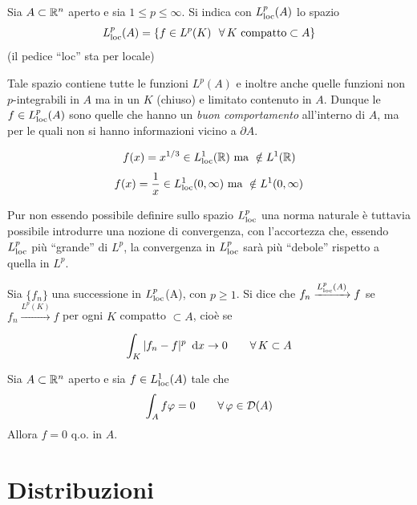 \begin{defn}
Sia $A\subset\mathbb{R}^n$ aperto e sia $1\leq p\leq\infty$. Si indica con $L^{p}_{\operatorname{loc}}(A)$ lo spazio
\begin{equation*}
L^{p}_{\loc}(A)=\left\{f\in L^p(K)\ \ \forall K\text{ compatto}\subset A\right\}
\end{equation*}
(il pedice ``loc'' sta per locale)
\end{defn}
Tale spazio contiene tutte le funzioni $L^p(A)$ e inoltre anche quelle funzioni non $p$-integrabili in $A$ ma in un $K$ (chiuso) e limitato contenuto in $A$. Dunque le $f\in L^{p}_{\operatorname{loc}}(A)$ sono quelle che hanno un \textit{buon comportamento} all'interno di $A$, ma per le quali non si hanno informazioni vicino a $\partial A$.

\begin{exa}
\begin{equation*}
f(x)=x^{1/3}\in L^1_{\operatorname{loc}}(\mathbb{R})\text{ ma }\notin L^1(\mathbb{R})
\end{equation*}
\begin{equation*}
f(x)=\frac{1}{x}\in L^1_{\operatorname{loc}}(0,\infty)\text{ ma }\notin L^1(0,\infty)
\end{equation*}
\end{exa}

Pur non essendo possibile definire sullo spazio $L^p_{\operatorname{loc}}$ una norma naturale è tuttavia possibile introdurre una nozione di convergenza, con l'accortezza che, essendo $L^p_{\operatorname{loc}}$ più ``grande'' di $L^p$, la convergenza in $L^p_{\operatorname{loc}}$ sarà più ``debole'' rispetto a quella in $L^p$.

\begin{defn}
Sia $\{f_n\}$ una successione in $L^p_{\operatorname{loc}}$(A), con $p\geq 1$. Si dice che $f_n\xrightarrow[]{L^p_{\operatorname{loc}}(A)}f$ se $f_n\xrightarrow[]{L^p(K)}f$ per ogni $K$ compatto $\subset A$, cioè se
\begin{equation*}
\int_K |f_n-f|^p\,\dx\to 0\qquad \forall K\subset A
\end{equation*}
\end{defn}

\begin{thm}
\label{per_dim_delta}
Sia $A\subset\mathbb{R}^n$ aperto e sia $f\in L^1_{\operatorname{loc}}(A)$ tale che
\begin{equation*}
\int_A f\varphi=0\qquad \forall \varphi\in\Dc(A)
\end{equation*}
Allora $f=0$ q.o. in $A$.
\end{thm}


\section{Distribuzioni}

